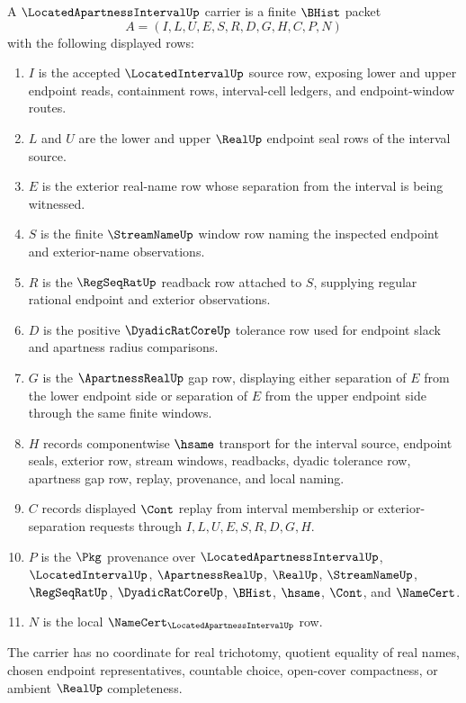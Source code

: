 \begin{definition}
\label{def:located-apartness-interval-carrier}
A $\LocatedApartnessIntervalUp$ carrier is a finite $\BHist$ packet
$$
A=(I,L,U,E,S,R,D,G,H,C,P,N)
$$
with the following displayed rows:
\begin{enumerate}
\item $I$ is the accepted $\LocatedIntervalUp$ source row, exposing lower and upper endpoint reads, containment rows, interval-cell ledgers, and endpoint-window routes.
\item $L$ and $U$ are the lower and upper $\RealUp$ endpoint seal rows of the interval source.
\item $E$ is the exterior real-name row whose separation from the interval is being witnessed.
\item $S$ is the finite $\StreamNameUp$ window row naming the inspected endpoint and exterior-name observations.
\item $R$ is the $\RegSeqRatUp$ readback row attached to $S$, supplying regular rational endpoint and exterior observations.
\item $D$ is the positive $\DyadicRatCoreUp$ tolerance row used for endpoint slack and apartness radius comparisons.
\item $G$ is the $\ApartnessRealUp$ gap row, displaying either separation of $E$ from the lower endpoint side or separation of $E$ from the upper endpoint side through the same finite windows.
\item $H$ records componentwise $\hsame$ transport for the interval source, endpoint seals, exterior row, stream windows, readbacks, dyadic tolerance row, apartness gap row, replay, provenance, and local naming.
\item $C$ records displayed $\Cont$ replay from interval membership or exterior-separation requests through $I,L,U,E,S,R,D,G,H$.
\item $P$ is the $\Pkg$ provenance over $\LocatedApartnessIntervalUp$, $\LocatedIntervalUp$, $\ApartnessRealUp$, $\RealUp$, $\StreamNameUp$, $\RegSeqRatUp$, $\DyadicRatCoreUp$, $\BHist$, $\hsame$, $\Cont$, and $\NameCert$.
\item $N$ is the local $\NameCert_{\LocatedApartnessIntervalUp}$ row.
\end{enumerate}
The carrier has no coordinate for real trichotomy, quotient equality of real names, chosen endpoint representatives, countable choice, open-cover compactness, or ambient $\RealUp$ completeness.
\end{definition}

